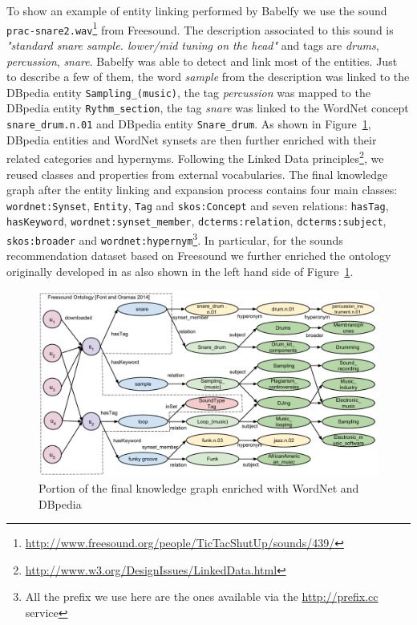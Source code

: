 To show an example of entity linking performed by Babelfy we use the sound \texttt{prac-snare2.wav}\footnote{\url{http://www.freesound.org/people/TicTacShutUp/sounds/439/}} from Freesound. The description associated to this sound is \textit{"standard snare sample. lower/mid tuning on the head"} and tags are \textit{drums}, \textit{percussion}, \textit{snare}. Babelfy was able to detect and link most of the entities. Just to describe a few of them, the word \textit{sample} from the description was linked to the DBpedia entity \texttt{Sampling\_(music)}, the tag \textit{percussion} was mapped to the DBpedia entity \texttt{Rythm\_section}, the tag \textit{snare} was linked to the WordNet concept \texttt{snare\_drum.n.01} and DBpedia entity \texttt{Snare\_drum}. As shown in Figure~\ref{fig:graph-rec:graph_enhancement}, DBpedia entities and WordNet synsets are then further enriched with their related categories and hypernyms. Following the Linked Data principles\footnote{\url{http://www.w3.org/DesignIssues/LinkedData.html}}, we reused classes and properties from external vocabularies. The final knowledge graph after the entity linking and expansion process contains four main classes: \texttt{wordnet:Synset}, \texttt{Entity}, \texttt{Tag} and \texttt{skos:Concept} and seven relations: \texttt{hasTag}, \texttt{hasKeyword}, \texttt{wordnet:synset\_member}, \texttt{dcterms:relation}, \texttt{dcterms:subject}, \texttt{skos:broader} and \texttt{wordnet:hypernym}\footnote{All the prefix we use here are the ones available via the \url{http://prefix.cc} service}.
In particular, for the sounds recommendation dataset based on Freesound we further enriched the ontology originally developed in \cite{Font2014} as also shown in the left hand side of Figure~\ref{fig:graph-rec:graph_enhancement}. 

\begin{figure}
\centering
\includegraphics[width=\textwidth]{ch06_graph-rec/pics/graph_all_final.pdf}
\caption{Portion of the final knowledge graph enriched with WordNet and DBpedia \label{fig:graph-rec:graph_enhancement}}
\end{figure}


